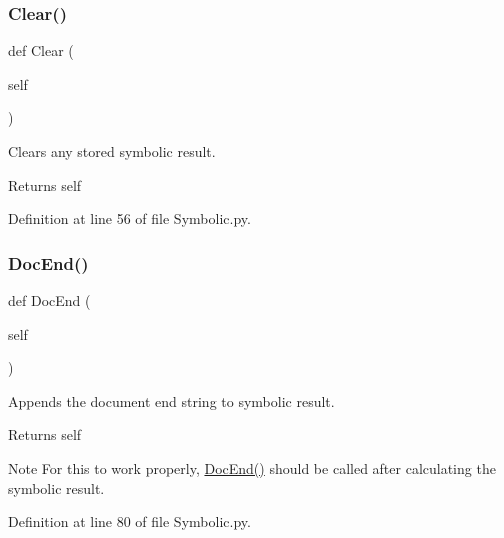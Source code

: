 \subsubsection{\texorpdfstring{Clear()}{Clear()}}
{\footnotesize\ttfamily def Clear (\begin{DoxyParamCaption}\item[{}]{self }\end{DoxyParamCaption})}



Clears any stored symbolic result. 

\begin{DoxyReturn}{Returns}
self 
\end{DoxyReturn}


Definition at line 56 of file Symbolic.\+py.

\mbox{\label{classSignalIntegrity_1_1SystemDescriptions_1_1Symbolic_1_1Symbolic_a91ac903754eabbc7f69d633a9304be70}} 
\subsubsection{\texorpdfstring{Doc\+End()}{DocEnd()}}
{\footnotesize\ttfamily def Doc\+End (\begin{DoxyParamCaption}\item[{}]{self }\end{DoxyParamCaption})}



Appends the document end string to symbolic result. 

\begin{DoxyReturn}{Returns}
self 
\end{DoxyReturn}
\begin{DoxyNote}{Note}
For this to work properly, \hyperlink{classSignalIntegrity_1_1SystemDescriptions_1_1Symbolic_1_1Symbolic_a91ac903754eabbc7f69d633a9304be70}{Doc\+End()} should be called after calculating the symbolic result. 
\end{DoxyNote}


Definition at line 80 of file Symbolic.\+py.

